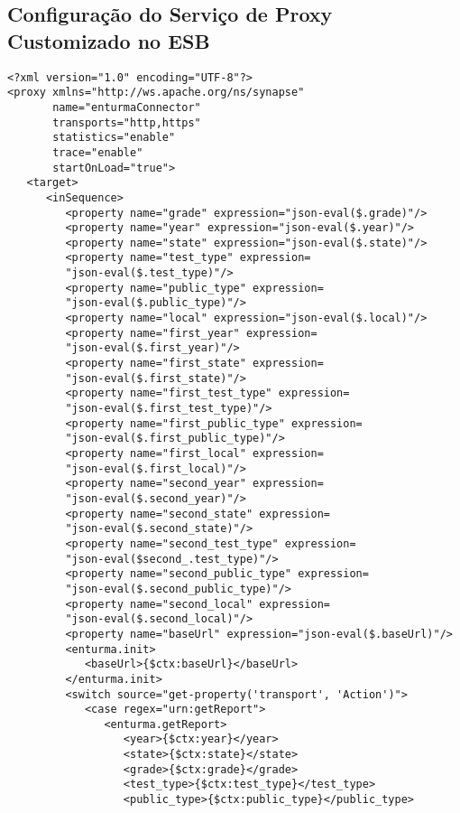 \begin{apendicesenv}

\partapendices

\chapter{Configuração do Serviço de Proxy Customizado no ESB}
\begin{lstlisting}
<?xml version="1.0" encoding="UTF-8"?>
<proxy xmlns="http://ws.apache.org/ns/synapse"
       name="enturmaConnector"
       transports="http,https"
       statistics="enable"
       trace="enable"
       startOnLoad="true">
   <target>
      <inSequence>
         <property name="grade" expression="json-eval($.grade)"/>
         <property name="year" expression="json-eval($.year)"/>
         <property name="state" expression="json-eval($.state)"/>
         <property name="test_type" expression=
         "json-eval($.test_type)"/>
         <property name="public_type" expression=
         "json-eval($.public_type)"/>
         <property name="local" expression="json-eval($.local)"/>
         <property name="first_year" expression=
         "json-eval($.first_year)"/>
         <property name="first_state" expression=
         "json-eval($.first_state)"/>
         <property name="first_test_type" expression=
         "json-eval($.first_test_type)"/>
         <property name="first_public_type" expression=
         "json-eval($.first_public_type)"/>
         <property name="first_local" expression=
         "json-eval($.first_local)"/>
         <property name="second_year" expression=
         "json-eval($.second_year)"/>
         <property name="second_state" expression=
         "json-eval($.second_state)"/>
         <property name="second_test_type" expression=
         "json-eval($second_.test_type)"/>
         <property name="second_public_type" expression=
         "json-eval($.second_public_type)"/>
         <property name="second_local" expression=
         "json-eval($.second_local)"/>
         <property name="baseUrl" expression="json-eval($.baseUrl)"/>
         <enturma.init>
            <baseUrl>{$ctx:baseUrl}</baseUrl>
         </enturma.init>
         <switch source="get-property('transport', 'Action')">
            <case regex="urn:getReport">
               <enturma.getReport>
                  <year>{$ctx:year}</year>
                  <state>{$ctx:state}</state>
                  <grade>{$ctx:grade}</grade>
                  <test_type>{$ctx:test_type}</test_type>
                  <public_type>{$ctx:public_type}</public_type>

\end{lstlisting}
\end{apendicesenv}
